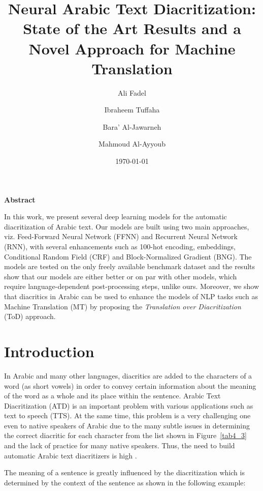 \documentclass[11pt,a4paper]{article}
\title{Neural Arabic Text Diacritization: State of the Art Results and a Novel Approach for Machine Translation}
\author{Ali Fadel}
\author{Ibraheem Tuffaha}
\author{Bara' Al-Jawarneh}
\author{Mahmoud Al-Ayyoub}
\affil{Jordan University of Science and Technology, Irbid, Jordan \authorcr
  \{\tt aliosm1997, bro.t.1996, baraaaljawarneh, malayyoub\}@gmail.com}
\date{\today}
\renewenvironment{abstract}{\centerline{\large\bf Abstract}\begin{list}{}{\setlength{\rightmargin}{0.6cm}\setlength{\leftmargin}{0.6cm}}\item[]\ignorespaces}{\unskip\end{list}}
\begin{document}
\maketitle
\begin{abstract}
In this work, we present several deep learning models for the automatic diacritization of Arabic text. Our models are built using two main approaches, viz. Feed-Forward Neural Network (FFNN) and Recurrent Neural Network (RNN), with several enhancements such as 100-hot encoding, embeddings, Conditional Random Field (CRF) and Block-Normalized Gradient (BNG). The models are tested on the only freely available benchmark dataset and the results show that our models are either better or on par with other models, which require language-dependent post-processing steps, unlike ours. Moreover, we show that diacritics in Arabic can be used to enhance the models of NLP tasks such as Machine Translation (MT) by proposing the \emph{Translation over Diacritization} (ToD) approach.
\end{abstract}

\section{Introduction}

In Arabic and many other languages, diacritics are added to the characters of a word (as short vowels) in order to convey certain information about the meaning of the word as a whole and its place within the sentence. Arabic Text Diacritization (ATD) is an important problem with various applications such as text to speech (TTS). At the same time, this problem is a very challenging one even to native speakers of Arabic due to the many subtle issues in determining the correct diacritic for each character from the list shown in Figure~\ref{tab4_3} and the lack of practice for many native speakers. Thus, the need to build automatic Arabic text diacritizers is high \cite{zitouni2009arabic}.

The meaning of a sentence is greatly influenced by the diacritization which is determined by the context of the sentence as shown in the following example:
\end{document}
